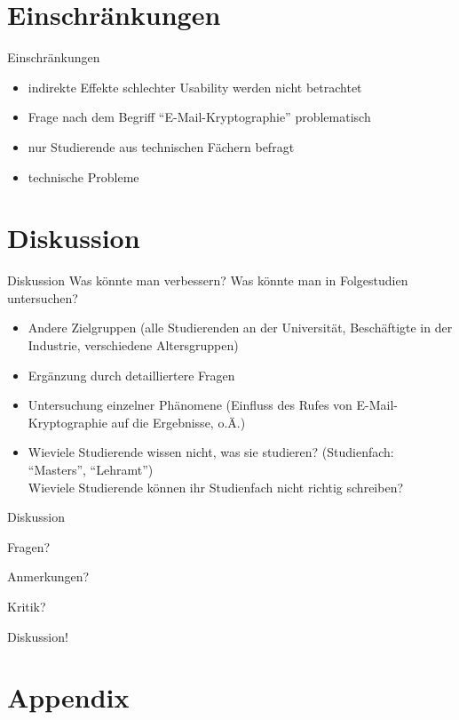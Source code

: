 \documentclass[]{beamer}
\begin{document}
\section{Einschränkungen}
\begin{frame}{Einschränkungen}
	  \begin{itemize}
    \item indirekte Effekte schlechter Usability werden nicht betrachtet
    \item Frage nach dem Begriff ``E-Mail-Kryptographie'' problematisch
    \item nur Studierende aus technischen Fächern befragt
    \item technische Probleme
	\end{itemize}
\end{frame}

\section{Diskussion}
\begin{frame}{Diskussion}
	Was könnte man verbessern? Was könnte man in Folgestudien untersuchen?
	\begin{itemize}[<+->]
		\item Andere Zielgruppen (alle Studierenden an der Universität, Beschäftigte in der Industrie, verschiedene Altersgruppen)
		\item Ergänzung durch detailliertere Fragen
		\item Untersuchung einzelner Phänomene (Einfluss des Rufes von E-Mail-Kryptographie auf die Ergebnisse, o.Ä.)
		\item Wieviele Studierende wissen nicht, was sie studieren? (Studienfach: ``Masters'', ``Lehramt'')\\
			Wieviele Studierende können ihr Studienfach nicht richtig schreiben?
	\end{itemize}
\end{frame}

\begin{frame}{Diskussion}
  \begin{center}
	Fragen?

	Anmerkungen?
    
	Kritik?
    
	Diskussion!
	\end{center}
\end{frame}

\appendix
\section{Appendix}
\end{document}
